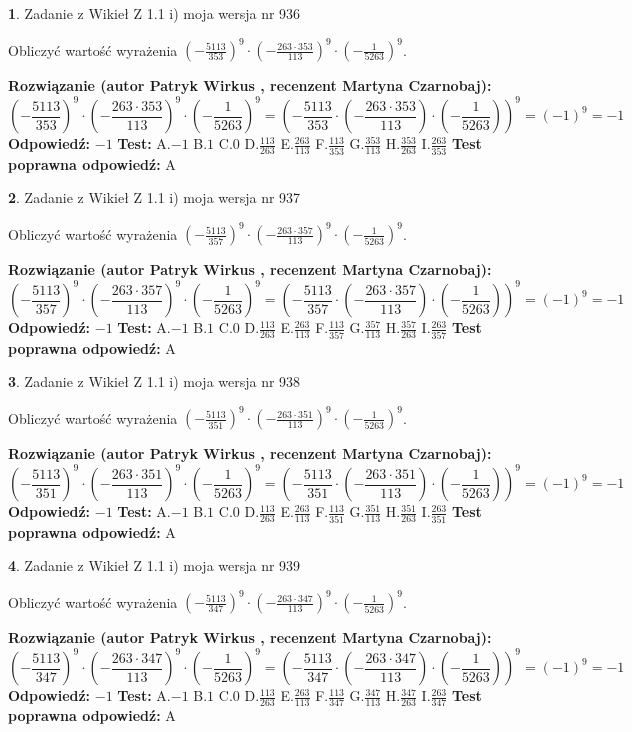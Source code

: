 \documentclass[12pt, a4paper]{article}
\theoremstyle{definition} %
\newtheorem{zad}{}
\newcommand{\zadStart}[1]{\begin{zad}#1\newline}
\newcommand{\zadStop}{\end{zad}}
\newcommand{\rozwStart}[2]{\noindent \textbf{Rozwiązanie (autor #1 , recenzent #2): }\newline}
\newcommand{\rozwStop}{\newline}
\newcommand{\odpStart}{\noindent \textbf{Odpowiedź:}\newline}
\newcommand{\odpStop}{\newline}
\newcommand{\testStart}{\noindent \textbf{Test:}\newline}
\newcommand{\testStop}{\newline}
\newcommand{\kluczStart}{\noindent \textbf{Test poprawna odpowiedź:}\newline}
\newcommand{\kluczStop}{\newline}
\begin{document}
\zadStart{Zadanie z Wikieł Z 1.1 i) moja wersja nr 936}

Obliczyć wartość wyrażenia $(-\frac{5113}{353})^{9} \cdot (-\frac{263 \cdot 353}{113})^{9} \cdot (-\frac{1}{5263})^{9}$.
\zadStop
\rozwStart{Patryk Wirkus}{Martyna Czarnobaj}
$$(-\frac{5113}{353})^{9} \cdot (-\frac{263 \cdot 353}{113})^{9} \cdot (-\frac{1}{5263})^{9} = (-\frac{5113}{353} \cdot (-\frac{263 \cdot 353}{113}) \cdot (-\frac{1}{5263}))^{9} = (-1)^{9} = -1$$
\rozwStop
\odpStart
$-1$
\odpStop
\testStart
A.$-1$ B.$1$ C.$0$ D.$\frac{113}{263}$ E.$\frac{263}{113}$
F.$\frac{113}{353}$ G.$\frac{353}{113}$
H.$\frac{353}{263}$
I.$\frac{263}{353}$
\testStop
\kluczStart
A
\kluczStop



\zadStart{Zadanie z Wikieł Z 1.1 i) moja wersja nr 937}

Obliczyć wartość wyrażenia $(-\frac{5113}{357})^{9} \cdot (-\frac{263 \cdot 357}{113})^{9} \cdot (-\frac{1}{5263})^{9}$.
\zadStop
\rozwStart{Patryk Wirkus}{Martyna Czarnobaj}
$$(-\frac{5113}{357})^{9} \cdot (-\frac{263 \cdot 357}{113})^{9} \cdot (-\frac{1}{5263})^{9} = (-\frac{5113}{357} \cdot (-\frac{263 \cdot 357}{113}) \cdot (-\frac{1}{5263}))^{9} = (-1)^{9} = -1$$
\rozwStop
\odpStart
$-1$
\odpStop
\testStart
A.$-1$ B.$1$ C.$0$ D.$\frac{113}{263}$ E.$\frac{263}{113}$
F.$\frac{113}{357}$ G.$\frac{357}{113}$
H.$\frac{357}{263}$
I.$\frac{263}{357}$
\testStop
\kluczStart
A
\kluczStop



\zadStart{Zadanie z Wikieł Z 1.1 i) moja wersja nr 938}

Obliczyć wartość wyrażenia $(-\frac{5113}{351})^{9} \cdot (-\frac{263 \cdot 351}{113})^{9} \cdot (-\frac{1}{5263})^{9}$.
\zadStop
\rozwStart{Patryk Wirkus}{Martyna Czarnobaj}
$$(-\frac{5113}{351})^{9} \cdot (-\frac{263 \cdot 351}{113})^{9} \cdot (-\frac{1}{5263})^{9} = (-\frac{5113}{351} \cdot (-\frac{263 \cdot 351}{113}) \cdot (-\frac{1}{5263}))^{9} = (-1)^{9} = -1$$
\rozwStop
\odpStart
$-1$
\odpStop
\testStart
A.$-1$ B.$1$ C.$0$ D.$\frac{113}{263}$ E.$\frac{263}{113}$
F.$\frac{113}{351}$ G.$\frac{351}{113}$
H.$\frac{351}{263}$
I.$\frac{263}{351}$
\testStop
\kluczStart
A
\kluczStop



\zadStart{Zadanie z Wikieł Z 1.1 i) moja wersja nr 939}

Obliczyć wartość wyrażenia $(-\frac{5113}{347})^{9} \cdot (-\frac{263 \cdot 347}{113})^{9} \cdot (-\frac{1}{5263})^{9}$.
\zadStop
\rozwStart{Patryk Wirkus}{Martyna Czarnobaj}
$$(-\frac{5113}{347})^{9} \cdot (-\frac{263 \cdot 347}{113})^{9} \cdot (-\frac{1}{5263})^{9} = (-\frac{5113}{347} \cdot (-\frac{263 \cdot 347}{113}) \cdot (-\frac{1}{5263}))^{9} = (-1)^{9} = -1$$
\rozwStop
\odpStart
$-1$
\odpStop
\testStart
A.$-1$ B.$1$ C.$0$ D.$\frac{113}{263}$ E.$\frac{263}{113}$
F.$\frac{113}{347}$ G.$\frac{347}{113}$
H.$\frac{347}{263}$
I.$\frac{263}{347}$
\testStop
\kluczStart
A
\kluczStop
\end{document}
